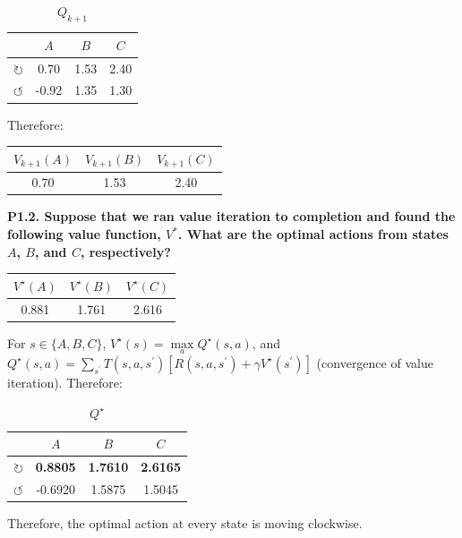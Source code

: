 \documentclass{homework}
\def\clockwise{\circlearrowright}
\def\counterclockwise{\circlearrowleft}
\begin{document}
\begin{table}[h!]
    \centering
    \begin{tabular}{lccc}
        \toprule
         & $A$ & $B$ & $C$ \\
        \midrule
        $\clockwise$ & 0.70 & 1.53 & 2.40 \\
        $\counterclockwise$ & -0.92  & 1.35 & 1.30 \\
        \bottomrule
    \end{tabular}
    \caption{$Q_{k+1}$}
    \label{tab:q11aqkp1}
\end{table}
Therefore:
\begin{table}[h!]
    \centering
    \begin{tabular}{c|c|c}
        \toprule
        $V_{k+1}(A)$ & $V_{k+1}(B)$ & $V_{k+1}(C)$ \\
        \midrule
        0.70 & 1.53 & 2.40 \\
        \bottomrule
    \end{tabular}
    \label{tab:q11avkp1}
\end{table}

\textbf{\large P1.2. Suppose that we ran value iteration to completion and found the following value function, $V^{*}$. What are the optimal actions from states $A$, $B$, and $C$, respectively?}

\begin{table}[h!]
    \centering
    \begin{tabular}{c|c|c}
        \toprule
        $V^{\star}(A)$ & $V^{\star}(B)$ & $V^{\star}(C)$ \\
        \midrule
        0.881 & 1.761 & 2.616 \\
        \bottomrule
    \end{tabular}
    \label{tab:q1str}
\end{table}
For $s \in \{ A, B, C \}$, $V^{\star}(s) = \max\limits_{a} Q^{\star}(s, a)$, and $Q^{\star}(s, a) = \sum\limits_{s^{\prime}}{ T(s, a, s^{\prime})[ R(s, a, s^{\prime}) + \gamma V^{\star}(s^{\prime}) ] }$ (convergence of value iteration). Therefore:

\begin{table}[h!]
    \centering
    \begin{tabular}{lccc}
        \toprule
         & $A$ & $B$ & $C$ \\
        \midrule
        $\clockwise$ & \textbf{0.8805} & \textbf{1.7610} & \textbf{2.6165} \\
        $\counterclockwise$ & -0.6920  & 1.5875 & 1.5045 \\
        \bottomrule
    \end{tabular}
    \caption{$Q^{\star}$}
    \label{tab:q12aqkp1}
\end{table}
Therefore, the optimal action at every state is moving clockwise.
\end{document}
